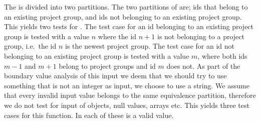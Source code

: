 The \vargroupid{} is divided into two partitions.
The two partitions of \vargroupid{} are; ids that belong to an existing project group, and ids not belonging to an existing project group.
%
%
This yields two tests for \vargroupid{}.
The test case for an id belonging to an existing project group is tested with a value $n$ where the id $n+1$ is not belonging to a project group, i.e.\ the id $n$ is the newest project group.
The test case for an id not belonging to an existing project group is tested with a value $m$, where both ids $m-1$ and $m+1$ belong to project groups and id $m$ does not.
As part of the boundary value analysis of this input we deem that we should try to use something that is not an integer as input, we choose to use a string.
We assume that every invalid input value belongs to the same equivalence partition, therefore we do not test for input of objects, null values, arrays etc.
This yields three test cases for this function.
In each of these \varuserids{} is a valid value.

